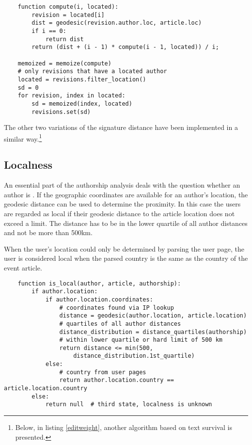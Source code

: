 \begin{lstlisting}
	function compute(i, located):
		revision = located[i]
		dist = geodesic(revision.author.loc, article.loc)
		if i == 0:
			return dist
		return (dist + (i - 1) * compute(i - 1, located)) / i;
		
	memoized = memoize(compute)
	# only revisions that have a located author
	located = revisions.filter_location() 
	sd = 0
	for revision, index in located:
		sd = memoized(index, located)
		revisions.set(sd)
\end{lstlisting}

The other two variations of the signature distance have been implemented in a similar way.\footnote{Below, in listing \ref{editweight}, another algorithm based on text survival is presented.}

\subsection{Localness}\label{sub:localness}

An essential part of the authorship analysis deals with the question whether an author is .
If the geographic coordinates are available for an author's location, the geodesic distance can be used to determine the proximity. 
In this case the users are regarded as local if their geodesic distance to the article location does not exceed a limit.
The distance has to be in the lower quartile of all author distances and not be more than 500km.

When the user's location could only be determined by parsing the user page, the user is considered local when the parsed country is the same as the country of the event article.

\begin{lstlisting}
	function is_local(author, article, authorship):
		if author.location:
			if author.location.coordinates:
				# coordinates found via IP lookup
				distance = geodesic(author.location, article.location)
				# quartiles of all author distances
				distance_distribution = distance_quartiles(authorship) 
				# within lower quartile or hard limit of 500 km
				return distance <= min(500, 
					distance_distribution.1st_quartile)
			else: 
				# country from user pages
				return author.location.country == article.location.country
		else:
			return null	 # third state, localness is unknown
\end{lstlisting}

